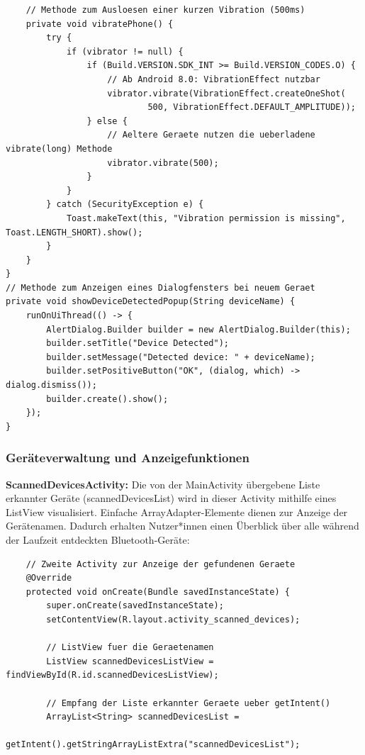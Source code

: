 \documentclass[a4paper, 12pt]{article} %
\begin{document}
\begin{spacing}{1.8}
\begin{lstlisting}
    // Methode zum Ausloesen einer kurzen Vibration (500ms)
    private void vibratePhone() {
        try {
            if (vibrator != null) {
                if (Build.VERSION.SDK_INT >= Build.VERSION_CODES.O) {
                    // Ab Android 8.0: VibrationEffect nutzbar
                    vibrator.vibrate(VibrationEffect.createOneShot(
                            500, VibrationEffect.DEFAULT_AMPLITUDE));
                } else {
                    // Aeltere Geraete nutzen die ueberladene vibrate(long) Methode
                    vibrator.vibrate(500);
                }
            }
        } catch (SecurityException e) {
            Toast.makeText(this, "Vibration permission is missing", Toast.LENGTH_SHORT).show();
        }
    }
}
// Methode zum Anzeigen eines Dialogfensters bei neuem Geraet
private void showDeviceDetectedPopup(String deviceName) {
    runOnUiThread(() -> {
        AlertDialog.Builder builder = new AlertDialog.Builder(this);
        builder.setTitle("Device Detected");
        builder.setMessage("Detected device: " + deviceName);
        builder.setPositiveButton("OK", (dialog, which) -> dialog.dismiss());
        builder.create().show();
    });
}
    \end{lstlisting}

\subsubsection{Geräteverwaltung und Anzeigefunktionen}
\textbf{ScannedDevicesActivity\cite{lukiano12_lkw_assist}:} Die von der MainActivity übergebene Liste erkannter Geräte (scannedDevicesList) wird in dieser Activity mithilfe eines ListView visualisiert. 
Einfache ArrayAdapter-Elemente dienen zur Anzeige der Gerätenamen. 
Dadurch erhalten Nutzer*innen einen Überblick über alle während der Laufzeit entdeckten Bluetooth-Geräte:

\begin{lstlisting}
    // Zweite Activity zur Anzeige der gefundenen Geraete
    @Override
    protected void onCreate(Bundle savedInstanceState) {
        super.onCreate(savedInstanceState);
        setContentView(R.layout.activity_scanned_devices);
    
        // ListView fuer die Geraetenamen
        ListView scannedDevicesListView = findViewById(R.id.scannedDevicesListView);
    
        // Empfang der Liste erkannter Geraete ueber getIntent()
        ArrayList<String> scannedDevicesList =
                getIntent().getStringArrayListExtra("scannedDevicesList");
    

\end{lstlisting}
\end{spacing}
\end{document}
